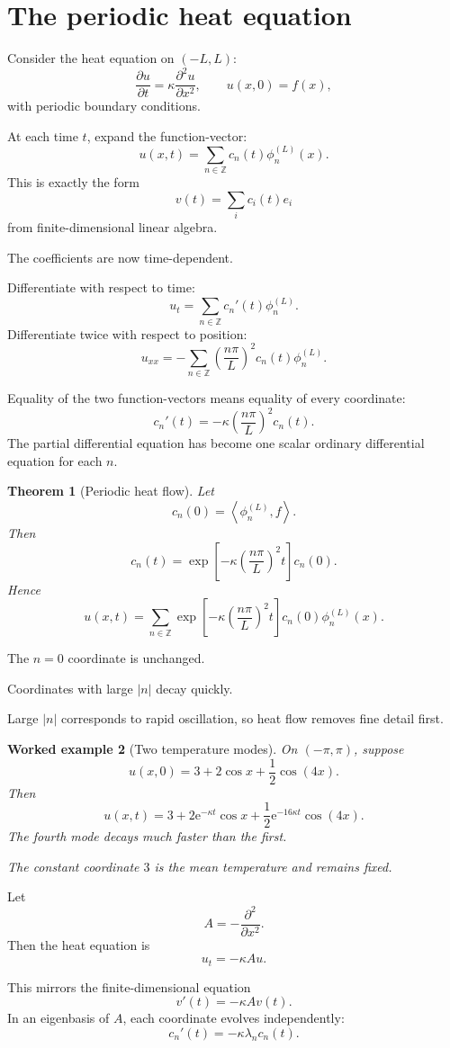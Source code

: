 \documentclass[11pt,a5paper,oneside,openany]{scrreprt}
\theoremstyle{notes}
\newtheorem{theorem}{Theorem}[section]
\theoremstyle{definitions}
\newtheorem{example}[theorem]{Worked example}
\newcommand{\Z}{\mathbb{Z}}
\newcommand{\ip}[2]{\left\langle #1,#2\right\rangle}
\newcommand{\e}{\mathrm{e}}
\begin{document}
\section{The periodic heat equation}

Consider the heat equation on $(-L,L)$:
\[
 \frac{\partial u}{\partial t}
 =\kappa\frac{\partial^2u}{\partial x^2},
 \qquad
 u(x,0)=f(x),
\]
with periodic boundary conditions.

At each time $t$, expand the function-vector:
\[
 \boxed{
 u(x,t)=\sum_{n\in\Z}c_n(t)\phi_n^{(L)}(x).}
\]
This is exactly the form
\[
 v(t)=\sum_i c_i(t)e_i
\]
from finite-dimensional linear algebra.

The coefficients are now time-dependent.

Differentiate with respect to time:
\[
 u_t
 =\sum_{n\in\Z}c_n'(t)\phi_n^{(L)}.
\]
Differentiate twice with respect to position:
\[
 u_{xx}
 =-\sum_{n\in\Z}
 \left(\frac{n\pi}{L}\right)^2
 c_n(t)\phi_n^{(L)}.
\]

Equality of the two function-vectors means equality of every coordinate:
\[
 c_n'(t)
 =-\kappa\left(\frac{n\pi}{L}\right)^2c_n(t).
\]
The partial differential equation has become one scalar ordinary
differential equation for each $n$.

\begin{theorem}[Periodic heat flow]
Let
\[
 c_n(0)=\ip{\phi_n^{(L)}}{f}.
\]
Then
\[
 \boxed{
 c_n(t)
 =\exp\!\left[
 -\kappa\left(\frac{n\pi}{L}\right)^2t
 \right]c_n(0).}
\]
Hence
\[
 \boxed{
 u(x,t)=\sum_{n\in\Z}
 \exp\!\left[
 -\kappa\left(\frac{n\pi}{L}\right)^2t
 \right]
 c_n(0)\phi_n^{(L)}(x).}
\]
\end{theorem}

The $n=0$ coordinate is unchanged.

Coordinates with large $|n|$ decay quickly.

Large $|n|$ corresponds to rapid oscillation, so heat flow removes fine
detail first.

\begin{example}[Two temperature modes]
On $(-\pi,\pi)$, suppose
\[
 u(x,0)=3+2\cos x+\frac12\cos(4x).
\]
Then
\[
 \boxed{
 u(x,t)=3+2\e^{-\kappa t}\cos x
 +\frac12\e^{-16\kappa t}\cos(4x).}
\]
The fourth mode decays much faster than the first.

The constant coordinate $3$ is the mean temperature and remains fixed.
\end{example}

\begin{bridge}
Let
\[
 A=-\frac{\partial^2}{\partial x^2}.
\]
Then the heat equation is
\[
 u_t=-\kappa Au.
\]

This mirrors the finite-dimensional equation
\[
 v'(t)=-\kappa Av(t).
\]
In an eigenbasis of $A$, each coordinate evolves independently:
\[
 c_n'(t)=-\kappa\lambda_n c_n(t).
\]
\end{bridge}
\end{document}

